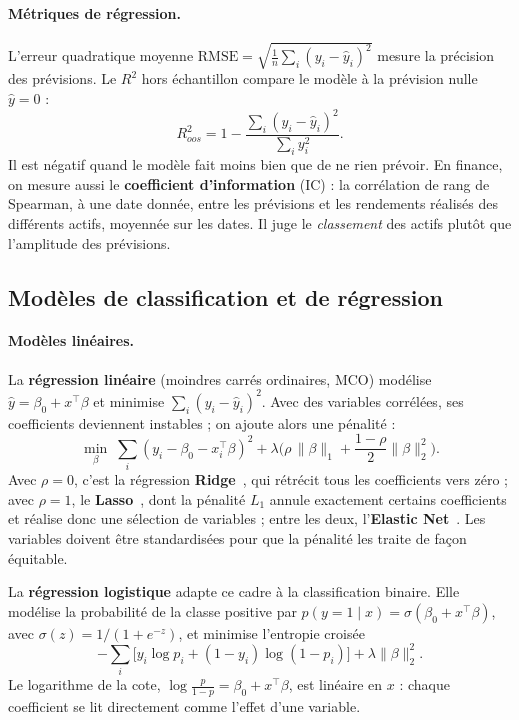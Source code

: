 \paragraph{Métriques de régression.} L'erreur quadratique moyenne $\text{RMSE} = \sqrt{\frac{1}{n}\sum_i (y_i - \hat y_i)^2}$ mesure la précision des prévisions. Le $R^2$ hors échantillon compare le modèle à la prévision nulle $\hat y = 0$ :
\begin{equation}
  R^2_{oos} = 1 - \frac{\sum_i (y_i - \hat y_i)^2}{\sum_i y_i^2}.
\end{equation}
Il est négatif quand le modèle fait moins bien que de ne rien prévoir. En finance, on mesure aussi le \textbf{coefficient d'information} (IC) : la corrélation de rang de Spearman, à une date donnée, entre les prévisions et les rendements réalisés des différents actifs, moyennée sur les dates. Il juge le \emph{classement} des actifs plutôt que l'amplitude des prévisions.

\subsection{Modèles de classification et de régression}

\paragraph{Modèles linéaires.} La \textbf{régression linéaire} (moindres carrés ordinaires, MCO) modélise $\hat y = \beta_0 + x^\top\beta$ et minimise $\sum_i (y_i - \hat y_i)^2$. Avec des variables corrélées, ses coefficients deviennent instables ; on ajoute alors une pénalité :
\begin{equation}
  \min_\beta \; \sum_i (y_i - \beta_0 - x_i^\top\beta)^2 + \lambda\Big(\rho\,\lVert\beta\rVert_1 + \frac{1-\rho}{2}\lVert\beta\rVert_2^2\Big).
\end{equation}
Avec $\rho = 0$, c'est la régression \textbf{Ridge}~\cite{hoerl1970}, qui rétrécit tous les coefficients vers zéro ; avec $\rho = 1$, le \textbf{Lasso}~\cite{tibshirani1996}, dont la pénalité $L_1$ annule exactement certains coefficients et réalise donc une sélection de variables ; entre les deux, l'\textbf{Elastic Net}~\cite{zou2005}. Les variables doivent être standardisées pour que la pénalité les traite de façon équitable.

La \textbf{régression logistique} adapte ce cadre à la classification binaire. Elle modélise la probabilité de la classe positive par $p(y=1\mid x) = \sigma(\beta_0 + x^\top\beta)$, avec $\sigma(z) = 1/(1+e^{-z})$, et minimise l'entropie croisée
\begin{equation}
  -\sum_i \Big[y_i \log p_i + (1-y_i)\log(1-p_i)\Big] + \lambda\lVert\beta\rVert_2^2 .
\end{equation}
Le logarithme de la cote, $\log\frac{p}{1-p} = \beta_0 + x^\top\beta$, est linéaire en $x$ : chaque coefficient se lit directement comme l'effet d'une variable.

